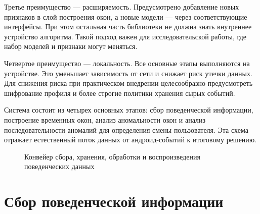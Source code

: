 \documentclass[oneside,senior,etd]{BYUPhys}
\begin{document}
Третье преимущество --- расширяемость. Предусмотрено добавление новых признаков в слой построения окон, а новые модели --- через соответствующие интерфейсы. При этом остальная часть библиотеки не должна знать внутреннее устройство алгоритма. Такой подход важен для исследовательской работы, где набор моделей и признаки могут меняться.

Четвертое преимущество --- локальность. Все основные этапы выполняются на устройстве. Это уменьшает зависимость от сети и снижает риск утечки данных. Для снижения риска при практическом внедрении целесообразно предусмотреть шифрование профиля и более строгие политики хранения сырых событий.

Система состоит из четырех основных этапов: сбор поведенческой информации, построение временных окон, анализ аномальности окон и анализ последовательности аномалий для определения смены пользователя. Эта схема отражает естественный поток данных от андроид-событий к итоговому решению.

\begin{figure}[ht]
\centering
{}
\caption{Конвейер сбора, хранения, обработки и воспроизведения поведенческих данных}
\label{fig:pipeline}
\end{figure}

\clearpage

\section{Сбор поведенческой информации}
\end{document}
